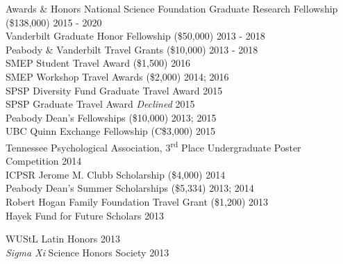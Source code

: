 \begin{rSection}{\textrm{Awards \& Honors}}
National Science Foundation Graduate Research Fellowship (\$138,000) 	\hfill{2015 - 2020}\smallskip\\
Vanderbilt Graduate Honor Fellowship (\$50,000)				\hfill{2013 - 2018}\smallskip\\	
Peabody \& Vanderbilt Travel Grants (\$10,000)				\hfill  {2013 - 2018}\smallskip\\
SMEP Student Travel Award (\$1,500)						\hfill{2016}\smallskip\\
SMEP Workshop Travel Awards (\$2,000)					\hfill{2014; 2016}\smallskip\\
SPSP Diversity Fund Graduate Travel Award %
\hfill{2015}\smallskip\\
SPSP Graduate Travel Award %
{\small \textit{Declined}} \hfill{2015}\smallskip\\
Peabody Dean's Fellowships (\$10,000)					\hfill  {2013; 2015}\smallskip\\
UBC Quinn Exchange Fellowship (C\$3,000) \hfill{2015}\smallskip\\
Tennessee Psychological Association, 3\textsuperscript{rd} Place Undergraduate Poster Competition \hfill{2014}\smallskip\\
ICPSR Jerome M. Clubb Scholarship (\$4,000) \hfill{2014}\smallskip\\
Peabody Dean's Summer Scholarships (\$5,334)			    \hfill  {2013; 2014}\smallskip\\	
Robert Hogan Family Foundation Travel Grant (\$1,200) 	\hfill  {2013}\smallskip\\
Hayek Fund for Future Scholars                      \hfill{2013}\smallskip\\
\begin{minipage}{\linewidth}
\vspace{1.1mm} WUStL Latin Honors \hfill{2013}\smallskip\\
\textit{Sigma Xi} Science Honors Society   	\hfill  {2013}
\end{minipage}%
\end{rSection}

